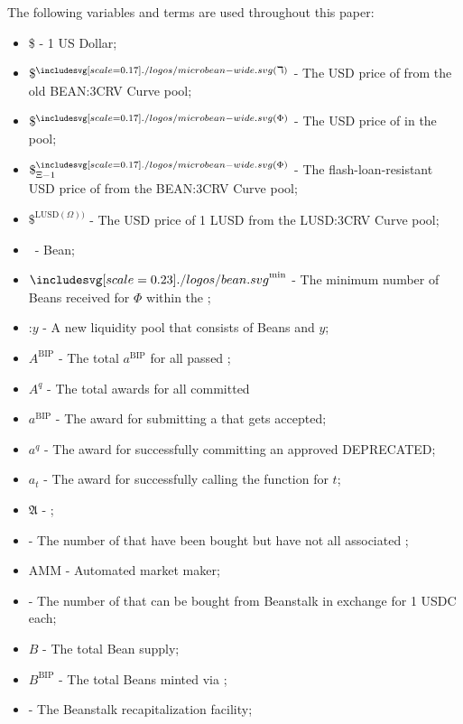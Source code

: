 \documentclass[class=article, crop=false]{standalone}
\begin{document}
The following variables and terms are used throughout this paper:
\begin{itemize}[topsep=0pt, itemsep=3pt,leftmargin=16pt]
    \item[] \$ - 1 US Dollar;
    \item[] $\$^{\bean(\daleth)}$ - The USD price of  from the old BEAN:3CRV Curve pool;
    \item[] $\$^{\bean(\Phi)}$ - The USD price of  in the pool;
    \item[] $\$^{\bean(\Phi)}_{\Xi-1}$ - The flash-loan-resistant USD price of  from the BEAN:3CRV Curve pool;
    \item[] $\$^{\text{LUSD}(\Omega))}$ - The USD price of 1 LUSD from the LUSD:3CRV Curve pool;
    \item[] \Bean\ - Bean;
    \item[] $\Bean^{\text{min}}$ - The minimum number of Beans received for   $\Phi$ within the ;
    \item[] \Bean:$y$ - A new liquidity pool that consists of Beans and $y$;
    \item[] $A^{\text{BIP}}$ - The total $a^{\text{BIP}}$ for all passed ;
    \item[] $A^q$ - The total awards for all committed     \item[] $a^{\text{BIP}}$ - The award for submitting a  that gets accepted;
    \item[] $a^q$ - The award for successfully committing an approved  DEPRECATED;
    \item[] $a_t$ - The award for successfully calling the  function for $t$;
    \item[] $\mathfrak{A}$ -  ;
    \item[]   - The number of  that have been bought but have not  all associated ;
    \item[] AMM - Automated market maker;
    \item[]   - The number of  that can be bought from Beanstalk in exchange for 1 USDC each;
    \item[] $B$ - The total Bean supply;
    \item[] $B^{\text{BIP}}$ - The total Beans minted via ;
    \item[]  - The Beanstalk recapitalization facility;

\end{itemize}
\end{document}
